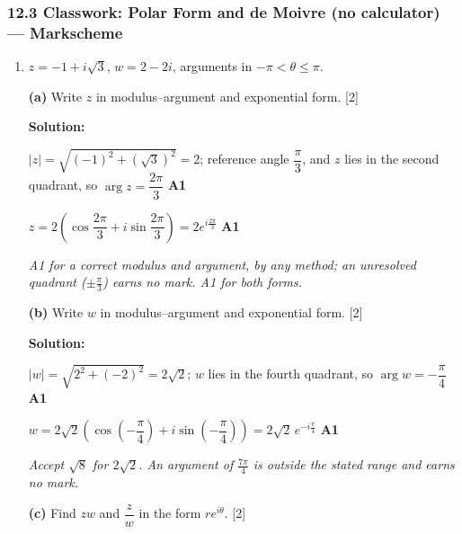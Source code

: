 \documentclass[12pt, twoside]{article}
\begin{document}
\subsubsection*{12.3 Classwork: Polar Form and de Moivre (no calculator)
--- Markscheme}

\begin{enumerate}[itemsep=0.3cm]


\item[1.] [Maximum mark: 8]

$z = -1 + i\sqrt{3}$, $w = 2 - 2i$, arguments in $-\pi < \theta \leq \pi$.

\medskip

\textbf{(a)} Write $z$ in modulus--argument and exponential form. \hfill [2]

\textbf{Solution:}

$|z| = \sqrt{(-1)^2 + (\sqrt{3})^2} = 2$; reference angle
$\dfrac{\pi}{3}$, and $z$ lies in the second quadrant, so
$\arg z = \dfrac{2\pi}{3}$ \hfill \textbf{A1}

$z = 2\left(\cos\dfrac{2\pi}{3} + i\sin\dfrac{2\pi}{3}\right)
= 2e^{i\frac{2\pi}{3}}$ \hfill \textbf{A1}

\emph{A1 for a correct modulus \emph{and} argument, by any method; an
unresolved quadrant ($\pm\frac{\pi}{3}$) earns no mark. A1 for both forms.}

\medskip

\textbf{(b)} Write $w$ in modulus--argument and exponential form. \hfill [2]

\textbf{Solution:}

$|w| = \sqrt{2^2 + (-2)^2} = 2\sqrt{2}$; $w$ lies in the fourth quadrant,
so $\arg w = -\dfrac{\pi}{4}$ \hfill \textbf{A1}

$w = 2\sqrt{2}\left(\cos\left(-\dfrac{\pi}{4}\right)
+ i\sin\left(-\dfrac{\pi}{4}\right)\right)
= 2\sqrt{2}\,e^{-i\frac{\pi}{4}}$ \hfill \textbf{A1}

\emph{Accept $\sqrt{8}$ for $2\sqrt{2}$. An argument of $\frac{7\pi}{4}$ is
outside the stated range and earns no mark.}

\medskip

\textbf{(c)} Find $zw$ and $\dfrac{z}{w}$ in the form $re^{i\theta}$.
\hfill [2]


\end{enumerate}
\end{document}
